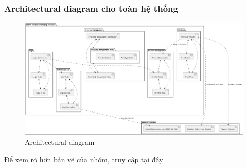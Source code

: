 \subsubsection{Architectural diagram cho toàn hệ thống}
\begin{figure}[H]
    \begin{center}
    \includegraphics[width=1\textwidth]{Images/Box-line + Deployment/ArchitectureDiagram.drawio.png}
\caption{Architectural diagram}
    \end{center}
\end{figure}
Để xem rõ hơn bản vẽ của nhóm, truy cập tại \href{https://drive.google.com/file/d/1vgr0dHbZ-yCTvMx9BN5ZEvlmdY8I_FYY/view?usp=sharing}{đây} 
